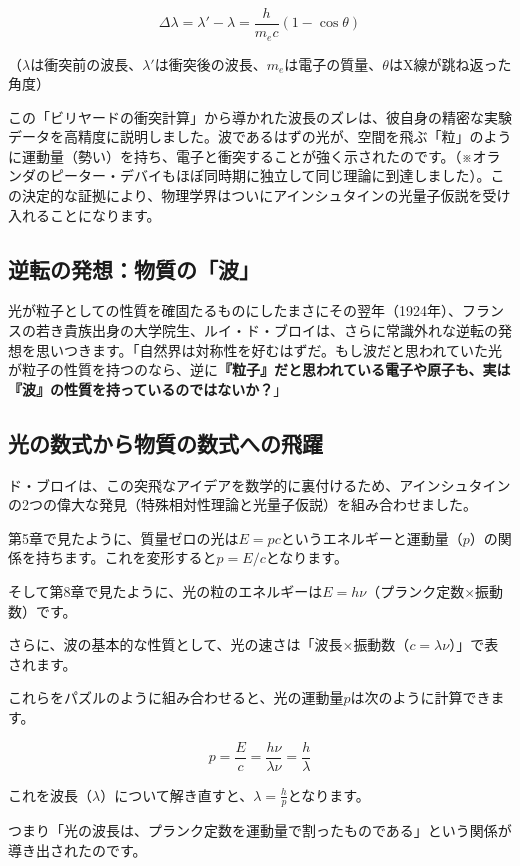 \[\Delta \lambda = \lambda' - \lambda = \frac{h}{m_e c} (1 - \cos\theta)\]

（\(\lambda\)は衝突前の波長、\(\lambda'\)は衝突後の波長、\(m_e\)は電子の質量、\(\theta\)はX線が跳ね返った角度）

この「ビリヤードの衝突計算」から導かれた波長のズレは、彼自身の精密な実験データを高精度に説明しました。波であるはずの光が、空間を飛ぶ「粒」のように運動量（勢い）を持ち、電子と衝突することが強く示されたのです。（※オランダのピーター・デバイもほぼ同時期に独立して同じ理論に到達しました）。この決定的な証拠により、物理学界はついにアインシュタインの光量子仮説を受け入れることになります。

\subsection{逆転の発想：物質の「波」}

光が粒子としての性質を確固たるものにしたまさにその翌年（1924年）、フランスの若き貴族出身の大学院生、ルイ・ド・ブロイは、さらに常識外れな逆転の発想を思いつきます。「自然界は対称性を好むはずだ。もし波だと思われていた光が粒子の性質を持つのなら、逆に\textbf{『粒子』だと思われている電子や原子も、実は『波』の性質を持っているのではないか？}」

\subsection{光の数式から物質の数式への飛躍}

ド・ブロイは、この突飛なアイデアを数学的に裏付けるため、アインシュタインの2つの偉大な発見（特殊相対性理論と光量子仮説）を組み合わせました。

第5章で見たように、質量ゼロの光は\(E = pc\)というエネルギーと運動量（\(p\)）の関係を持ちます。これを変形すると\(p = E/c\)となります。

そして第8章で見たように、光の粒のエネルギーは\(E = h\nu\)（プランク定数\(\times\)振動数）です。

さらに、波の基本的な性質として、光の速さは「波長\(\times\)振動数（\(c = \lambda\nu\)）」で表されます。

これらをパズルのように組み合わせると、光の運動量\(p\)は次のように計算できます。

\[p = \frac{E}{c} = \frac{h\nu}{\lambda\nu} = \frac{h}{\lambda}\]

これを波長（\(\lambda\)）について解き直すと、\(\lambda = \frac{h}{p}\)となります。

つまり「光の波長は、プランク定数を運動量で割ったものである」という関係が導き出されたのです。

